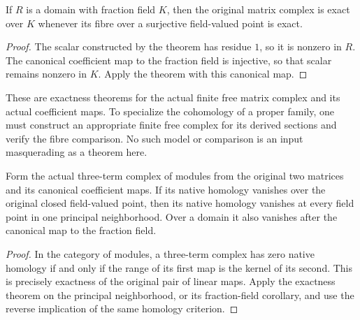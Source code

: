 \begin{corollary}
\label{cor:kn-specialization-finite-free-generic-exactness}
\leanok
{}
If $R$ is a domain with fraction field $K$, then the original matrix
complex is exact over $K$ whenever its fibre over a surjective
field-valued point is exact.
\end{corollary}
\begin{proof}
The scalar constructed by the theorem has residue $1$, so it is
nonzero in $R$.  The canonical coefficient map to the fraction field
is injective, so that scalar remains nonzero in $K$.  Apply the
theorem with this canonical map.
\end{proof}

\begin{remark}
\label{rmk:kn-specialization-perfect-complex-frontier}
These are exactness theorems for the actual finite free matrix complex
and its actual coefficient maps.  To specialize the cohomology of a
proper family, one must construct an appropriate finite free complex
for its derived sections and verify the fibre comparison.  No such
model or comparison is an input masquerading as a theorem here.
\end{remark}

\begin{corollary}
\label{cor:kn-specialization-native-homology}
\leanok
{}
Form the actual three-term complex of modules from the original two
matrices and its canonical coefficient maps.  If its native homology
vanishes over the original closed field-valued point, then its native
homology vanishes at every field point in one principal neighborhood.
Over a domain it also vanishes after the canonical map to the fraction
field.
\end{corollary}
\begin{proof}
In the category of modules, a three-term complex has zero native
homology if and only if the range of its first map is the kernel of
its second.  This is precisely exactness of the original pair of
linear maps.  Apply the exactness theorem on the principal
neighborhood, or its fraction-field corollary, and use the reverse
implication of the same homology criterion.
\end{proof}

